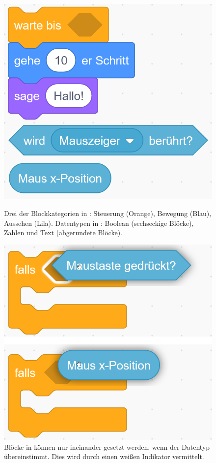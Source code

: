 \begin{figure}[!ht]
  \includegraphics[width=\linewidth]{assets/scratch-types.png}
  \caption[Drei der Blockkategorien in \Scratch{}]{Drei der Blockkategorien in \Scratch{}: Steuerung (Orange), Bewegung (Blau), Aussehen (Lila). Datentypen in \Scratch{}: Boolean (sechseckige Blöcke), Zahlen und Text (abgerundete Blöcke).}
  \label{fig:scratch-types}
  \endminipage
  \hfill
  \includegraphics[width=\linewidth]{assets/scratch-drop.png}
  \caption[Indikator beim Zusammensetzen von Blöcken in \Scratch{}]{Blöcke in \Scratch{} können nur ineinander gesetzt werden, wenn der Datentyp übereinstimmt. Dies wird durch einen weißen Indikator vermittelt.}
  \label{fig:scratch-drop}
  \endminipage
\end{figure}

